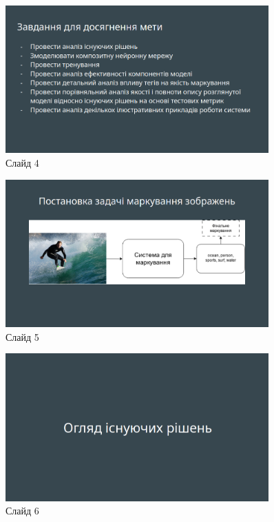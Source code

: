\documentclass{udstu}
\begin{document}
\begin{figure}[!ht]
	\centering
	\includegraphics[width=0.9\textwidth]{PNG/present/present-4}
	\caption{Слайд 4}
\end{figure}

\begin{figure}[!ht]
	\centering
	\includegraphics[width=0.9\textwidth]{PNG/present/present-5}
	\caption{Слайд 5}
\end{figure}

\begin{figure}[!ht]
	\centering
	\includegraphics[width=0.9\textwidth]{PNG/present/present-6}
	\caption{Слайд 6}
\end{figure}
\end{document}
